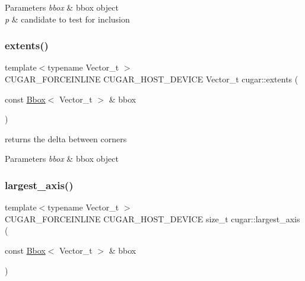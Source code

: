 \begin{DoxyParams}{Parameters}
{\em bbox} & bbox object \\
\hline
{\em p} & candidate to test for inclusion \\
\hline
\end{DoxyParams}
\mbox{\label{group___bbox_module_ga4f5184c6a804324810a86f4e6ccd29f4}} 
\subsubsection{\texorpdfstring{extents()}{extents()}}
{\footnotesize\ttfamily template$<$typename Vector\+\_\+t $>$ \\
C\+U\+G\+A\+R\+\_\+\+F\+O\+R\+C\+E\+I\+N\+L\+I\+NE C\+U\+G\+A\+R\+\_\+\+H\+O\+S\+T\+\_\+\+D\+E\+V\+I\+CE Vector\+\_\+t cugar\+::extents (\begin{DoxyParamCaption}\item[{const \hyperlink{structcugar_1_1_bbox}{Bbox}$<$ Vector\+\_\+t $>$ \&}]{bbox }\end{DoxyParamCaption})}

returns the delta between corners


\begin{DoxyParams}{Parameters}
{\em bbox} & bbox object \\
\hline
\end{DoxyParams}
\mbox{\label{group___bbox_module_ga45c74efdebfc6b9233fecb19aa268e45}} 
\subsubsection{\texorpdfstring{largest\+\_\+axis()}{largest\_axis()}}
{\footnotesize\ttfamily template$<$typename Vector\+\_\+t $>$ \\
C\+U\+G\+A\+R\+\_\+\+F\+O\+R\+C\+E\+I\+N\+L\+I\+NE C\+U\+G\+A\+R\+\_\+\+H\+O\+S\+T\+\_\+\+D\+E\+V\+I\+CE size\+\_\+t cugar\+::largest\+\_\+axis (\begin{DoxyParamCaption}\item[{const \hyperlink{structcugar_1_1_bbox}{Bbox}$<$ Vector\+\_\+t $>$ \&}]{bbox }\end{DoxyParamCaption})}

